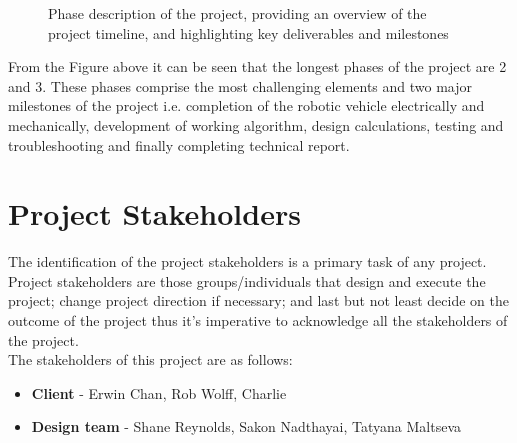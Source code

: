 \documentclass[a4paper]{article}
\begin{document}
\begin{figure}[h]
\caption{Phase description of the project, providing an overview of the project timeline, and highlighting key deliverables and milestones}
\end{figure}

From the Figure above it can be seen that the longest phases of the project are 2 and 3. These phases comprise the most challenging elements and two major milestones of the project i.e. completion of the robotic vehicle electrically and mechanically, development of working algorithm, design calculations, testing and troubleshooting and finally completing technical report. 

\section{Project Stakeholders}
The identification of the project stakeholders is a primary task of any project. Project stakeholders are those groups/individuals that design and execute the project; change project direction if necessary; and last but not least  decide on the outcome of the project thus it's imperative to acknowledge all the stakeholders of the project.\\

The stakeholders of this project are as follows:
\begin{itemize}
\item \textbf{Client} - Erwin Chan, Rob Wolff, Charlie
\item \textbf{Design team} - Shane Reynolds, Sakon Nadthayai, Tatyana Maltseva  
\end{itemize}
\end{document}
